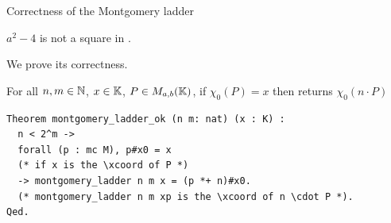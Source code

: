 \documentclass[8pt,aspectratio=169]{beamer}
\begin{document}
%
%


%
%
\begin{frame}[fragile]{Correctness of the Montgomery ladder}


	\begin{hypothesis}
		$a^2-4$ is not a square in \K.
	\end{hypothesis}

	We prove its correctness.
	\begin{theorem}
		\label{thm:montgomery-ladder-correct}
		For all $n, m \in \mathbb{N}$, $x \in \mathbb{K}$, $P \in M_{a,b}(\mathbb{K})$,
		if $\chi_0(P) = x$ then  returns $\chi_0(n \cdot P)$
	\end{theorem}
	\begin{lstlisting}[language=Coq, basicstyle=\normalsize]
Theorem montgomery_ladder_ok (n m: nat) (x : K) :
  n < 2^m ->
  forall (p : mc M), p#x0 = x
  (* if x is the \xcoord of P *)
  -> montgomery_ladder n m x = (p *+ n)#x0.
  (* montgomery_ladder n m xp is the \xcoord of n \cdot P *).
Qed.
  \end{lstlisting}

\end{frame}


%
%
\end{document}
